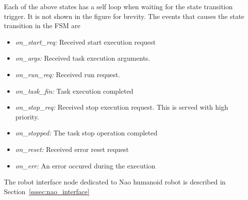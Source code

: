 Each of the above states has a self loop when waiting for the state transition trigger. It is not shown in the figure for brevity. The events that causes the state transition in the FSM are
\begin{itemize}[leftmargin={1cm},topsep={0pt},itemsep={0pt},partopsep={0pt},parsep={0pt}] 
\item \emph{on\_start\_req:} Received start execution request
\item \emph{on\_args:} Received task execution arguments.
\item \emph{on\_run\_req:} Received run request.
\item \emph{on\_task\_fin:} Task execution completed
\item \emph{on\_stop\_req:} Received stop execution request. This is served with high priority.
\item \emph{on\_stopped:} The task stop operation completed
\item \emph{on\_reset:} Received error reset request
\item \emph{on\_err:} An error occured during the execution
\end{itemize}
The robot interface node dedicated to Nao humanoid robot is described in Section~\ref{sssec:nao_interface}
